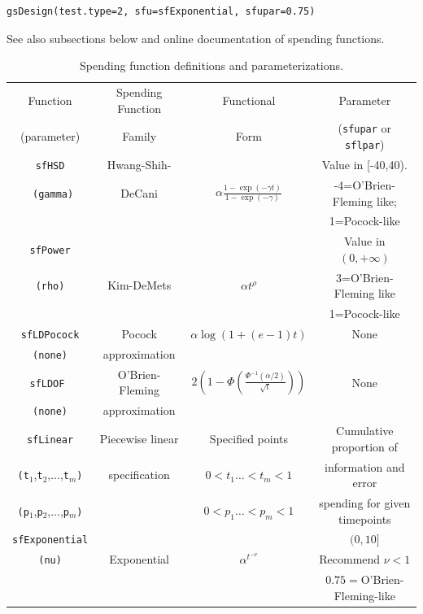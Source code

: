 \bigskip

\begin{verbatim}
gsDesign(test.type=2, sfu=sfExponential, sfupar=0.75)
\end{verbatim}
\bigskip

See also subsections below and online documentation of spending functions.

\bigskip

\begin{table}
\caption{Spending function definitions and parameterizations.}
\begin{tabular}
[c]{cccc}\hline
Function & Spending Function & Functional & Parameter\\
(parameter) & Family & Form & (\texttt{sfupar} or \texttt{sflpar})\\\hline
\texttt{sfHSD} & Hwang-Shih- &  & Value in [-40,40).\\
\texttt{\ (gamma)} & DeCani & $\alpha\frac{1-\exp(-\gamma t)}{1-\exp(-\gamma
)}$ & -4=O'Brien-Fleming like;\\
&  &  & 1=Pocock-like\\\hline
\texttt{sfPower} &  &  & Value in $(0,+\infty)$\\
\texttt{(rho)} & Kim-DeMets & $\alpha t^{\rho}$ & 3=O'Brien-Fleming like\\
&  &  & 1=Pocock-like\\\hline
\texttt{sfLDPocock} & Pocock & $\alpha\log(1+(e-1)t)$ & None\\
\texttt{(none)} & approximation &  & \\\hline
\texttt{sfLDOF } & O'Brien-Fleming & $2\left(  1-\Phi\left(  \frac{\Phi
^{-1}(\alpha/2)}{\sqrt{t}}\right)  \right)  $ & None\\
\texttt{(none)} & approximation &  & \\\hline
\texttt{sfLinear} & Piecewise linear & Specified points & Cumulative proportion of\\
\texttt{(t}$_{1}$,\texttt{t}$_{2}$,...,\texttt{t}$_{m}$\texttt{)}
&specification 
& $0<t_{1}\ldots<t_{m}<1$ 
& information and error\\
\texttt{(p}$_{1}$,\texttt{p}$_{2}$,...,\texttt{p}$_{m}$\texttt{)} 
&& $0<p_{1}\ldots<p_{m}<1$
& spending for given timepoints\\\hline
\texttt{sfExponential} &  &  & $(0,10]$\\
\texttt{(nu)} & Exponential & $\alpha^{t^{-\nu}}$ & Recommend $\nu<1$\\
&  &  & $0.75=$O'Brien-Fleming-like\\\hline

\end{tabular}
\end{table}
